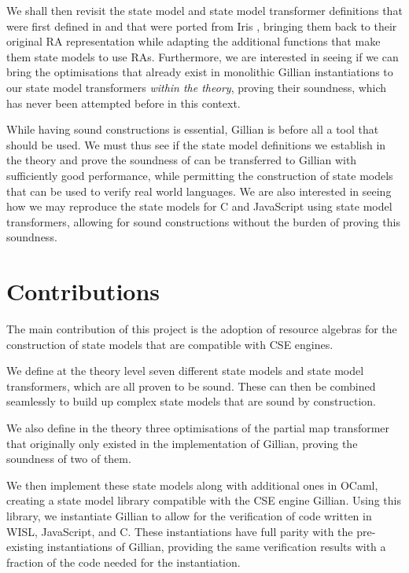 We shall then revisit the state model and state model transformer definitions that were first defined in \cite{sacha-phd} and that were ported from Iris \cite{iris}, bringing them back to their original RA representation while adapting the additional functions that make them state models to use RAs. Furthermore, we are interested in seeing if we can bring the optimisations that already exist in monolithic Gillian instantiations to our state model transformers \emph{within the theory}, proving their soundness, which has never been attempted before in this context.

While having sound constructions is essential, Gillian is before all a tool that should be used. We must thus see if the state model definitions we establish in the theory and prove the soundness of can be transferred to Gillian with sufficiently good performance, while permitting the construction of state models that can be used to verify real world languages. We are also interested in seeing how we may reproduce the state models for C and JavaScript using state model transformers, allowing for sound constructions without the burden of proving this soundness.

\section{Contributions}

The main contribution of this project is the adoption of resource algebras for the construction of state models that are compatible with CSE engines.

We define at the theory level seven different state models and state model transformers, which are all proven to be sound. These can then be combined seamlessly to build up complex state models that are sound by construction.

We also define in the theory three optimisations of the partial map transformer that originally only existed in the implementation of Gillian, proving the soundness of two of them.

We then implement these state models along with additional ones in OCaml, creating a state model library compatible with the CSE engine Gillian. Using this library, we instantiate Gillian to allow for the verification of code written in WISL, JavaScript, and C. These instantiations have full parity with the pre-existing instantiations of Gillian, providing the same verification results with a fraction of the code needed for the instantiation.

